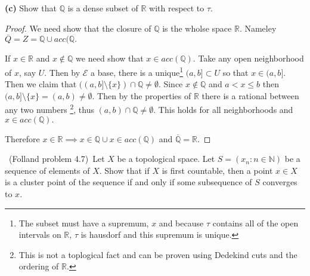 \documentclass[11pt]{amsart}
\theoremstyle{definition}
\numberwithin{theorem}{section}
\numberwithin{definition}{section}
\numberwithin{equation}{section}
\def\scripte{{\mathcal E}}
\begin{document}
\noindent \textbf{(c)} Show that $\mathbb{Q}$ is a dense subset of $\mathbb{R}$ with respect to $\tau.$
\begin{proof}
	We need show that the closure of $\mathbb{Q}$ is the wholse space $\mathbb{R}$. Nameley $\overline{Q} = Z = \mathbb{Q} \cup acc(\mathbb{Q}.$

	If $x \in \mathbb{R}$ and $x \notin \mathbb{Q}$ we need show that $x \in acc(\mathbb{Q}).$ Take any open neighborhood of $x$, say $U$. Then by $\scripte$ a base, there is a unique\footnote{The subset must have a supremum, $x$ and because $\tau$ contains all of the open intervals on $\mathbb{R}$, $\tau$ is hausdorf and this supremum is unique.} $(a,b] \subset U$ so that $x \in (a,b].$ Then we claim that $((a, b] \setminus \{x\} )\cap \mathbb{Q} \neq \emptyset.$ Since $x \notin \mathbb{Q}$ and $a < x \leq b$ then $(a,b] \setminus \{x\} = (a,b) \neq \emptyset$. Then by the properties of $\mathbb{R}$ there is a rational between any two numbers \footnote{This is not a toplogical fact and can be proven using Dedekind cuts and the ordering of $\mathbb{R}$.}, thus $(a,b) \cap \mathbb{Q} \neq \emptyset.$ This holds for all neighborhoods and $x \in acc(\mathbb{Q}).$

	Therefore $x \in \mathbb{R} \implies x \in \mathbb{Q} \cup x \in acc(\mathbb{Q})$ and $\overline{\mathbb{Q}} = \mathbb{R}.$ 
\end{proof}
\medskip {}\ (Folland problem 4.7)\ Let $X$ be a topological space. Let $S = (x_n : n \in \mathbb{N})$ be a sequence of elements of $X$. Show that if $X$ is first countable, then a point $x \in X$ is a cluster point of the sequence if and only if some subsequence of $S$ converges to $x.$
\end{document}
